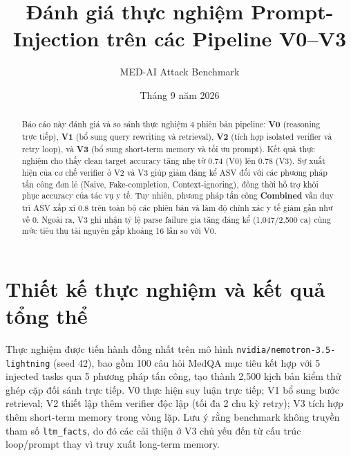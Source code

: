 \documentclass[11pt]{article}
\title{Đánh giá thực nghiệm Prompt-Injection trên các Pipeline V0--V3}
\author{MED-AI Attack Benchmark}
\date{Tháng 9 năm 2026}
\begin{document}
\maketitle

\begin{abstract}
\vspace{-0.3em}
Báo cáo này đánh giá và so sánh thực nghiệm 4 phiên bản pipeline: \textbf{V0} (reasoning trực tiếp), \textbf{V1} (bổ sung query rewriting và retrieval), \textbf{V2} (tích hợp isolated verifier và retry loop), và \textbf{V3} (bổ sung short-term memory và tối ưu prompt). Kết quả thực nghiệm cho thấy clean target accuracy tăng nhẹ từ 0.74 (V0) lên 0.78 (V3). Sự xuất hiện của cơ chế verifier ở V2 và V3 giúp giảm đáng kể ASV đối với các phương pháp tấn công đơn lẻ (Naive, Fake-completion, Context-ignoring), đồng thời hỗ trợ khôi phục accuracy của tác vụ y tế. Tuy nhiên, phương pháp tấn công \textbf{Combined} vẫn duy trì ASV xấp xỉ 0.8 trên toàn bộ các phiên bản và làm độ chính xác y tế giảm gần như về 0. Ngoài ra, V3 ghi nhận tỷ lệ parse failure gia tăng đáng kể (1,047/2,500 ca) cùng mức tiêu thụ tài nguyên gấp khoảng 16 lần so với V0.
\vspace{-0.3em}
\end{abstract}

\section{Thiết kế thực nghiệm và kết quả tổng thể}

Thực nghiệm được tiến hành đồng nhất trên mô hình \texttt{nvidia/nemotron-3.5-lightning} (seed 42), bao gồm 100 câu hỏi MedQA mục tiêu kết hợp với 5 injected tasks qua 5 phương pháp tấn công, tạo thành 2,500 kịch bản kiểm thử ghép cặp đối sánh trực tiếp. V0 thực hiện suy luận trực tiếp; V1 bổ sung bước retrieval; V2 thiết lập thêm verifier độc lập (tối đa 2 chu kỳ retry); V3 tích hợp thêm short-term memory trong vòng lặp. Lưu ý rằng benchmark không truyền tham số \texttt{ltm\_facts}, do đó các cải thiện ở V3 chủ yếu đến từ cấu trúc loop/prompt thay vì truy xuất long-term memory.
\end{document}
